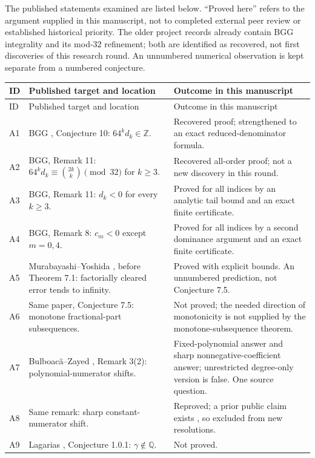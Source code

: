 \documentclass[11pt,a4paper]{article}
\theoremstyle{definition}
\theoremstyle{remark}
\newcommand{\Q}{\mathbb Q}
\newcommand{\Z}{\mathbb Z}
\numberwithin{equation}{section}
\begin{document}
The published statements examined are listed below. ``Proved here'' refers to
the argument supplied in this manuscript, not to completed external peer review
or established historical priority. The older project records
\cite{p1:priorBGG,p1:priorTransfer} already contain BGG integrality and its mod-$32$
refinement; both are identified as recovered, not first discoveries of this
research round. An unnumbered numerical observation is kept separate from a
numbered conjecture.

\small
\begin{longtable}{@{}p{}p{}p{}@{}}
\toprule ID&Published target and location&Outcome in this manuscript\\\midrule
\endfirsthead
\toprule ID&Published target and location&Outcome in this manuscript\\\midrule
\endhead
A1&BGG \cite{p1:BrentGlasserGuttmann2019}, Conjecture 10: $64^kd_k\in\Z$.&Recovered proof; strengthened to an exact reduced-denominator formula.\\
A2&BGG, Remark 11: $64^kd_k\equiv\binom{2k}{k}\pmod{32}$ for $k\ge3$.&Recovered all-order proof; not a new discovery in this round.\\
A3&BGG, Remark 11: $d_k<0$ for every $k\ge3$.&Proved for all indices by an analytic tail bound and an exact finite certificate.\\
A4&BGG, Remark 8: $c_m<0$ except $m=0,4$.&Proved for all indices by a second dominance argument and an exact finite certificate.\\
A5&Murabayashi--Yoshida \cite{p1:MurabayashiYoshida2024}, before Theorem 7.1: factorially cleared error tends to infinity.&Proved with explicit bounds. An unnumbered prediction, not Conjecture 7.5.\\
A6&Same paper, Conjecture 7.5: monotone fractional-part subsequences.&Not proved; the needed direction of monotonicity is not supplied by the monotone-subsequence theorem.\\
A7&Bulboac\u a--Zayed \cite{p1:bz2026}, Remark 3(2): polynomial-numerator shifts.&Fixed-polynomial answer and sharp nonnegative-coefficient answer; unrestricted degree-only version is false. One source question.\\
A8&Same remark: sharp constant-numerator shift.&Reproved; a prior public claim exists \cite{p1:pudim2026}, so excluded from new resolutions.\\
A9&Lagarias \cite{p1:Lagarias2013}, Conjecture 1.0.1: $\gamma\notin\Q$.&Not proved.\\

\end{longtable}
\end{document}
